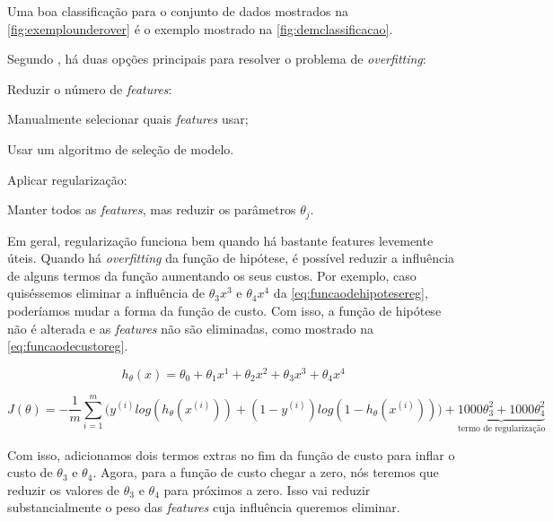 Uma boa classificação para o conjunto de dados mostrados na \autoref{fig:exemplounderover} é o exemplo mostrado na \autoref{fig:demclassificacao}.

Segundo \cite{machinelearningcoursera}, há duas opções principais para resolver o problema de \textit{overfitting}:

\begin{alineas}
	\item Reduzir o número de \textit{features}:
		\begin{alineas}
			\item Manualmente selecionar quais \textit{features} usar;
			\item Usar um algoritmo de seleção de modelo.
		\end{alineas}
	\item Aplicar regularização:
		\begin{alineas}
			\item Manter todos as \textit{features}, mas reduzir os parâmetros $\theta_j$.
		\end{alineas}
\end{alineas}

Em geral, regularização funciona bem quando há bastante features levemente úteis. Quando há \textit{overfitting} da função de hipótese, é possível reduzir a influência de alguns termos da função aumentando os seus custos. Por exemplo, caso quiséssemos eliminar a influência de $\theta_3x^3$ e $\theta_4x^4$ da \autoref{eq:funcaodehipotesereg}, poderíamos mudar a forma da função de custo. Com isso, a função de hipótese não é alterada e as \textit{features} não são eliminadas, como mostrado na \autoref{eq:funcaodecustoreg}.

\begin{equation} \label{eq:funcaodehipotesereg}
h_{\theta}(x) = \theta_0 + \theta_1 x^1 + \theta_2 x^2 + \theta_3 x^3 + \theta_4 x^4
\end{equation}

\begin{equation} \label{eq:funcaodecustoreg}
J(\theta) = - \frac{1}{m}\sum\limits_{i=1}^{m}\Big( y^{(i)}log(h_{\theta}(x^{(i)})) + (1-y^{(i)})log(1 - h_{\theta}(x^{(i)})) \Big)
+ \underbrace{1000 \theta_3^2 + 1000 \theta_4^2}_\text{termo de regularização}
\end{equation}

Com isso, adicionamos dois termos extras no fim da função de custo para inflar o custo de $\theta_3$ e $\theta_4$. Agora, para a função de custo chegar a zero, nós teremos que reduzir os valores de $\theta_3$ e $\theta_4$ para próximos a zero. Isso vai reduzir substancialmente o peso das \textit{features} cuja influência queremos eliminar.

